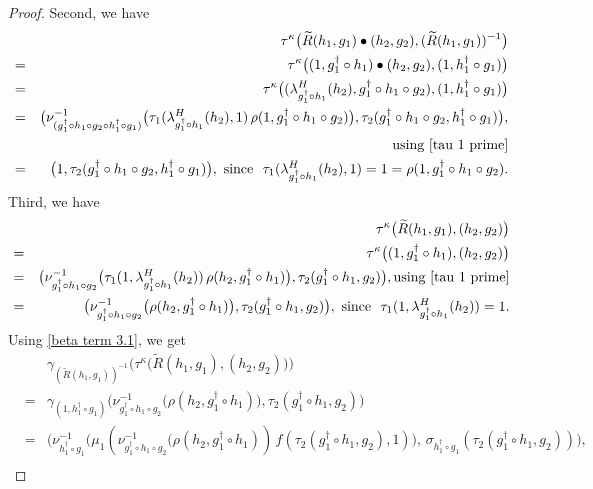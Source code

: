 \documentclass{jonasart}
\theoremstyle{plain}
\begin{document}
\begin{proof}
		Second, we have
		\begin{eqnarray}
			&&	\tau^\kappa\big(\widetilde{R}(h_1,g_1) \bullet (h_2,g_2),(\widetilde{R}(h_1,g_1))^{-1}\big) \nonumber\\
			&=&\tau^\kappa\big((1,g_1^\dagger\circ h_1) \bullet (h_2,g_2),(1,h_1^\dagger\circ g_1)\big)\nonumber\\
			&=&\tau^\kappa\big((\lambda^H_{g_1^\dagger\circ h_1}(h_2),g_1^\dagger\circ h_1\circ g_2),(1,h_1^\dagger\circ g_1)\big)\nonumber\\
			&=& \big(\nu^{-1}_{(g_1^\dagger\circ h_1\circ g_2\circ h_1^\dagger\circ g_1)}\big(\tau_1(\lambda^H_{g_1^\dagger\circ h_1}(h_2),1) \, \rho(1,g_1^\dagger\circ h_1\circ g_2)\big), \tau_2(g_1^\dagger\circ h_1\circ g_2,h_1^\dagger\circ g_1) \big),\nonumber\\
			&&\text{using \eqref{tau 1 prime}}\nonumber\\
			&=& \big(1,\tau_2(g_1^\dagger\circ h_1\circ g_2,h_1^\dagger\circ g_1) \big),~\text{since ~$\tau_1(\lambda^H_{g_1^\dagger\circ h_1}(h_2),1)=1=\rho(1,g_1^\dagger\circ h_1\circ g_2)$}.\label{beta term 2}
		\end{eqnarray}
		Third, we have
		\begin{eqnarray}
			&& \tau^\kappa\big(\widetilde{R}(h_1,g_1),(h_2,g_2)\big) \nonumber\\
			&=&\tau^\kappa\big((1,g_1^\dagger\circ h_1),(h_2,g_2)\big)\nonumber\\
			&=&\big(\nu^{-1}_{g_1^\dagger\circ h_1\circ g_2}\big(\tau_1(1,\lambda^H_{g_1^\dagger\circ h_1}(h_2)) \, \rho(h_2,g_1^\dagger\circ h_1)\big),\tau_2(g_1^\dagger\circ h_1,g_2)\big),\text{using \eqref{tau 1 prime}}\nonumber\\
			&=&\big(\nu^{-1}_{g_1^\dagger\circ h_1\circ g_2}\big(\rho(h_2,g_1^\dagger\circ h_1)\big),\tau_2(g_1^\dagger\circ h_1,g_2)\big), ~\text{since ~$\tau_1(1,\lambda^H_{g_1^\dagger\circ h_1}(h_2))=1$.}\label{beta term 3.1}
		\end{eqnarray}
		Using \eqref{beta term 3.1}, we get
		\begin{eqnarray}
			&& \gamma_{(\widetilde{R}(h_1,g_1))^{-1}} \big(\tau^\kappa \big(\widetilde{R}(h_1,g_1),(h_2,g_2) \big)\big)\nonumber\\
			&=&\gamma_{(1,h_1^\dagger\circ g_1)}\big(\nu^{-1}_{g_1^\dagger\circ h_1\circ g_2}\big(\rho(h_2,g_1^\dagger\circ h_1)\big),\tau_2(g_1^\dagger\circ h_1,g_2)\big)\nonumber\\
			&=& \big(\nu^{-1}_{h_1^\dagger\circ g_1}\big(\mu_1(\nu^{-1}_{g_1^\dagger\circ h_1\circ g_2}\big(\rho(h_2,g_1^\dagger\circ h_1)) \, f(\tau_2(g_1^\dagger\circ h_1,g_2),1) \big),\, \sigma_{h_1^\dagger\circ g_1}(\tau_2(g_1^\dagger\circ h_1,g_2))\big), \nonumber\\

\end{eqnarray}
\end{proof}
\end{document}
